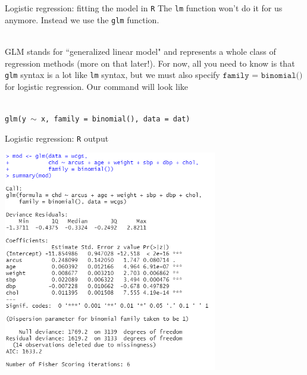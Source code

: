 \documentclass[10pt,t]{beamer}
\begin{document}
\begin{frame}{Logistic regression: fitting the model in \texttt{R}}
	The \texttt{lm} function won't do it for us anymore. Instead we use the \texttt{glm} function. 
	\\ ~\ 
	
	GLM stands for ``generalized linear model" and represents a whole class of regression methods (more on that later!). For now, all you need to know is that \texttt{glm} syntax is a lot like \texttt{lm} syntax, but we must also specify $\texttt{family = binomial()}$ for logistic regression. Our command will look like
	\\ ~\
	
	\texttt{glm(y $\sim$ x, family = binomial(), data = dat)}
\end{frame}

\begin{frame}{Logistic regression: \texttt{R} output}
	\vspace{-1cm}
		\begin{center}
		\includegraphics[width=0.7\textwidth]{./figs/multiple_logistic_regression_arcus}
	\end{center}
\end{frame}
\end{document}
